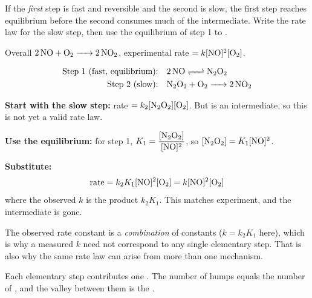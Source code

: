 \documentclass{apchem-notes}
\begin{document}


If the \emph{first} step is fast and reversible and the second is slow, the
first step reaches equilibrium before the second consumes much of the
intermediate. Write the rate law for the slow step, then use the
equilibrium of step 1 to .

\begin{workedexample}
Overall $\ce{2NO + O2 -> 2NO2}$, experimental
rate $= k[\ce{NO}]^2[\ce{O2}]$.

\begin{align*}
  \text{Step 1 (fast, equilibrium):} &\quad \ce{2NO <=> N2O2} \\
  \text{Step 2 (slow):} &\quad \ce{N2O2 + O2 -> 2NO2}
\end{align*}

\textbf{Start with the slow step:}
rate $= k_2[\ce{N2O2}][\ce{O2}]$. But  is an intermediate, so this
is not yet a valid rate law.

\textbf{Use the equilibrium:} for step 1,
$K_1 = \dfrac{[\ce{N2O2}]}{[\ce{NO}]^2}$, so
$[\ce{N2O2}] = K_1[\ce{NO}]^2$.

\textbf{Substitute:}
\[ \text{rate} = k_2K_1[\ce{NO}]^2[\ce{O2}] = k[\ce{NO}]^2[\ce{O2}] \]
where the observed $k$ is the product $k_2K_1$. This matches experiment,
and the intermediate is gone. \checkmark
\end{workedexample}

\begin{apctrap}
The observed rate constant is a \emph{combination} of constants
($k = k_2K_1$ here), which is why a measured $k$ need not correspond to any
single elementary step. That is also why the same rate law can arise from
more than one mechanism.
\end{apctrap}



Each elementary step contributes one . The
number of humps equals the number of , and the
valley between them is the .
\end{document}

